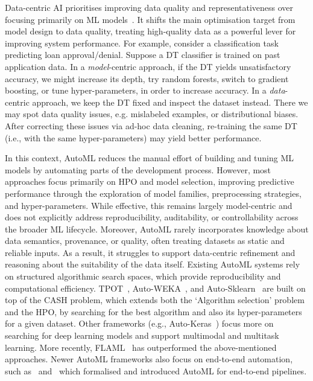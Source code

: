 \documentclass[runningheads]{llncs}
\begin{document}
Data-centric \ac{AI} prioritises improving data quality and representativeness over focusing primarily on \ac{ML} models~\cite{zha2025data}.
%
It shifts the main optimisation target from model design to data quality,
treating high-quality data as a powerful lever for improving system performance.
%
For example,
consider a classification task predicting loan approval/denial.
%
Suppose a \ac{DT} classifier is trained on past application data.
%
In a \emph{model}-centric approach,
if the \ac{DT} yields unsatisfactory accuracy,
we might increase its depth,
try random forests,
switch to gradient boosting,
or tune hyper-parameters,
in order to increase accuracy.
%
In a \emph{data}-centric approach,
we keep the \ac{DT} fixed and inspect the dataset instead.
%
There we may spot data quality issues,
e.g. mislabeled examples,
or distributional biases.
%
After correcting these issues via ad-hoc data cleaning, %
re-training the same \ac{DT} (i.e., with the same hyper-parameters) may yield better performance.

In this context, \Ac{AutoML} reduces the manual effort of building and tuning \ac{ML} models by automating parts of the development process.
%
However, most approaches focus primarily on \ac{HPO} and model selection,
improving predictive performance through the exploration of model families, preprocessing strategies, and hyper-parameters.
%
While effective, this remains largely model-centric and does not explicitly address reproducibility, auditability, or controllability across the broader \ac{ML} lifecycle.
%
Moreover, \ac{AutoML} rarely incorporates knowledge about data semantics, provenance, or quality,
often treating datasets as static and reliable inputs.
%
As a result, it struggles to support data-centric refinement and reasoning about the suitability of the data itself.
%
Existing \ac{AutoML} systems rely on structured algorithmic search spaces,
which provide reproducibility and computational efficiency.
%
%
TPOT~\cite{olson2016tpot},
Auto-WEKA~\cite{DBLP:conf/kdd/ThorntonHHL13},
and
Auto-Sklearn~\cite{DBLP:journals/jmlr/FeurerEFLH22}
are built on top of the \ac{CASH} problem,
which extends both the `Algorithm selection' problem
and
the \ac{HPO},
by searching for the best algorithm and also its hyper-parameters for a given dataset.
%
Other frameworks
(e.g., Auto-Keras~\cite{DBLP:conf/kdd/JinSH19})
focus more on searching for deep learning models and support multimodal and multitask learning.
%
More recently,
FLAML~\cite{DBLP:conf/kdd/0001W0Q22} has outperformed the above-mentioned approaches.
%
Newer \ac{AutoML} frameworks also focus on end-to-end automation,
such as~\cite{FranciaGP23} and~\cite{DBLP:conf/pakdd/FranciaGG24}
which formalised and introduced \ac{AutoML} for end-to-end pipelines.
\end{document}
